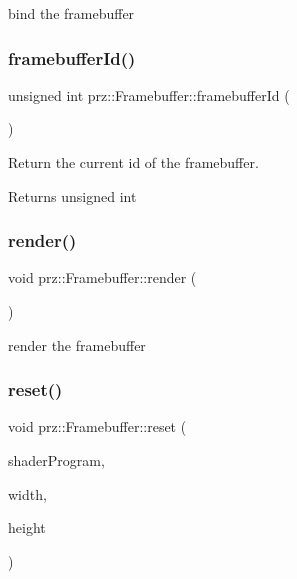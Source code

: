 bind the framebuffer 

\mbox{\label{classprz_1_1_framebuffer_aca934dc2ffb0798e04faf37c8df8d6b1}} 
\subsubsection{\texorpdfstring{framebufferId()}{framebufferId()}}
{\footnotesize\ttfamily unsigned int prz\+::\+Framebuffer\+::framebuffer\+Id (\begin{DoxyParamCaption}{ }\end{DoxyParamCaption})\hspace{0.3cm}{\ttfamily [inline]}}



Return the current id of the framebuffer. 

\begin{DoxyReturn}{Returns}
unsigned int 
\end{DoxyReturn}
\mbox{\label{classprz_1_1_framebuffer_a2db3bf6a0337607f5627dda5bd167987}} 
\subsubsection{\texorpdfstring{render()}{render()}}
{\footnotesize\ttfamily void prz\+::\+Framebuffer\+::render (\begin{DoxyParamCaption}{ }\end{DoxyParamCaption})}



render the framebuffer 

\mbox{\label{classprz_1_1_framebuffer_aa3c0cee259022d2c0c09f50cba65b538}} 
\subsubsection{\texorpdfstring{reset()}{reset()}\hspace{0.1cm}{\footnotesize\ttfamily [1/2]}}
{\footnotesize\ttfamily void prz\+::\+Framebuffer\+::reset (\begin{DoxyParamCaption}\item[{P\+S\+Ptr$<$ \mbox{\hyperlink{classprz_1_1_shader___program}{Shader\+\_\+\+Program}} $>$}]{shader\+Program,  }\item[{unsigned int}]{width,  }\item[{unsigned int}]{height }\end{DoxyParamCaption})}



